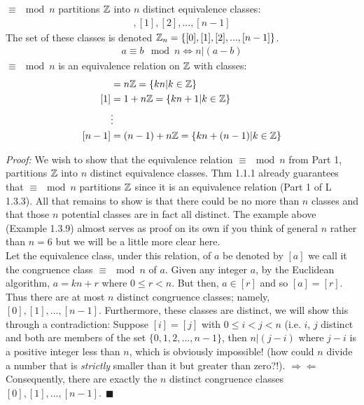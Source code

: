 \begin{lemma}[Part 2] 
$\equiv \mod n$ partitions ${\mathbb{ Z}}$ into $n$ distinct equivalence classes:
\begin{align}
    [0],[1],[2],...,[n-1]\nonumber
\end{align}
The set of these classes is denoted ${\mathbb{ Z}}_n=\{[0],[1],[2],...,[n-1]\}$.
\begin{align}
    a\equiv b\mod n \iff n|(a-b) \nonumber 
\end{align}
$\equiv \mod n$ is an equivalence relation on ${\mathbb{ Z}}$ with classes:
\begin{align}
    [0]&= n\Z=\{kn|k\in \Z\} \nonumber\\
    [1]&= 1+n\Z=\{kn+1|k\in \Z\} \nonumber\\
    &\vdots \nonumber \\
    [n-1]&= (n-1)+n\Z = \{kn+(n-1)|k\in \Z \} \nonumber
\end{align}

\textit{Proof:} We wish to show that the equivalence relation $\equiv\mod n$ from Part 1, partitions ${\mathbb{ Z}}$ into $n$ distinct equivalence classes. Thm 1.1.1 already guarantees that $\equiv\mod n$ partitions ${\mathbb{ Z}}$ since it is an equivalence relation (Part 1 of L 1.3.3). All that remains to show is that there could be no more than $n$ classes and that those $n$ potential classes are in fact all distinct. The example above (Example 1.3.9) almost serves as proof on its own if you think of general $n$ rather than $n=6$ but we will be a little more clear here. \steezybreak\\
\noindent Let the equivalence class, under this relation, of $a$ be denoted by $[a]$ 
we call it the congruence class $\equiv\mod n$ of $a$. Given any integer $a$, by the
Euclidean algorithm, $a = kn + r$ where $0 \leq r < n$. But then, $a \in [r]$ and
so $[a] = [r]$. Thus there are at most $n$ distinct congruence classes; namely,
$[0], [1], ... , [n- 1]$. Furthermore, these classes are distinct, we will show this through a contradiction: Suppose $[i] = [j]$ with $0 \leq i < j < n$ (i.e. $i$, $j$ distinct and both are members of the set $\{0,1,2,...,n-1\}$, then $n | (j - i)$ where $j - i$ is a positive integer less than $n$, which is obviously impossible! (how could $n$ divide a number that is \textit{strictly} smaller than it but greater than zero?!). $\Rightarrow\Leftarrow$ Consequently, there are exactly the $n$ distinct congruence classes $[0], [1], ... , [n - 1]. \ \ \blacksquare$
\end{lemma}

